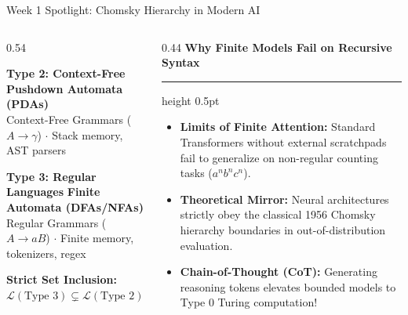 \documentclass[aspectratio=169, 10pt]{beamer}
\newcommand{\colheader}[1]{%
  {\noindent\footnotesize\bfseries\color{gimpanavy}#1}%
  \vspace{0.03cm}%
  {\color{gimpanavy!30}\hrule height 0.5pt}%
  \vspace{0.08cm}%
}
\begin{document}
\begin{frame}{Week 1 Spotlight: Chomsky Hierarchy in Modern AI}
\begin{columns}[T]
\begin{column}{0.54\textwidth}
\begin{tcolorbox}[conceptcard, colback=accentAmber!7, borderline west={2.5pt}{0pt}{accentAmber}, top=1.2pt, bottom=1.2pt, before=\vspace{0.5pt}, after=\vspace{0.5pt}]
        \scriptsize
        \textbf{Type 2: Context-Free} \hfill \textbf{Pushdown Automata (PDAs)}\\
        {\tiny\color{gimpaslate}Context-Free Grammars ($A \to \gamma$) $\cdot$ Stack memory, AST parsers}
      \end{tcolorbox}
      \begin{tcolorbox}[conceptcard, colback=accentGreen!8, borderline west={2.5pt}{0pt}{accentGreen}, top=1.2pt, bottom=1.2pt, before=\vspace{0.5pt}, after=\vspace{0.5pt}]
        \scriptsize
        \textbf{Type 3: Regular Languages} \hfill \textbf{Finite Automata (DFAs/NFAs)}\\
        {\tiny\color{gimpaslate}Regular Grammars ($A \to aB$) $\cdot$ Finite memory, tokenizers, regex}
      \end{tcolorbox}
      \vspace{0.03cm}
      \begin{center}
        {\tiny\color{charcoalText}\textbf{Strict Set Inclusion:} $\mathcal{L}(\text{Type 3}) \subsetneq \mathcal{L}(\text{Type 2}) \subsetneq \mathcal{L}(\text{Type 1}) \subsetneq \mathcal{L}(\text{Type 0})$}
      \end{center}
    \end{column}

    \hfill

    \begin{column}{0.44\textwidth}
      \colheader{Why Finite Models Fail on Recursive Syntax}
      \vspace{0.02cm}
      \begin{tcolorbox}[conceptcard, top=3pt, bottom=3pt]
        \begin{itemize}\setlength{\itemsep}{2.5pt}\footnotesize
          \item \textbf{Limits of Finite Attention:} Standard Transformers without external scratchpads fail to generalize on non-regular counting tasks ($a^n b^n c^n$).
          \item \textbf{Theoretical Mirror:} Neural architectures strictly obey the classical 1956 Chomsky hierarchy boundaries in out-of-distribution evaluation.
          \item \textbf{Chain-of-Thought (CoT):} Generating reasoning tokens elevates bounded models to Type 0 Turing computation!
        \end{itemize}
      \end{tcolorbox}
    \end{column}
  \end{columns}
\end{frame}
\end{document}
